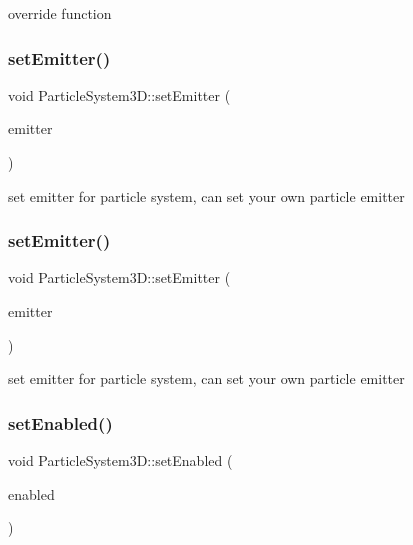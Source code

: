 override function \mbox{\label{classParticleSystem3D_aeb2593035516362a6e8209efdc8af68e}} 
\subsubsection{\texorpdfstring{set\+Emitter()}{setEmitter()}\hspace{0.1cm}{\footnotesize\ttfamily [1/2]}}
{\footnotesize\ttfamily void Particle\+System3\+D\+::set\+Emitter (\begin{DoxyParamCaption}\item[{\hyperlink{classParticle3DEmitter}{Particle3\+D\+Emitter} $\ast$}]{emitter }\end{DoxyParamCaption})}

set emitter for particle system, can set your own particle emitter \mbox{\label{classParticleSystem3D_aeb2593035516362a6e8209efdc8af68e}} 
\subsubsection{\texorpdfstring{set\+Emitter()}{setEmitter()}\hspace{0.1cm}{\footnotesize\ttfamily [2/2]}}
{\footnotesize\ttfamily void Particle\+System3\+D\+::set\+Emitter (\begin{DoxyParamCaption}\item[{\hyperlink{classParticle3DEmitter}{Particle3\+D\+Emitter} $\ast$}]{emitter }\end{DoxyParamCaption})}

set emitter for particle system, can set your own particle emitter \mbox{\label{classParticleSystem3D_a7e2e3536676b85183c6bb3e04e9f33ec}} 
\subsubsection{\texorpdfstring{set\+Enabled()}{setEnabled()}\hspace{0.1cm}{\footnotesize\ttfamily [1/2]}}
{\footnotesize\ttfamily void Particle\+System3\+D\+::set\+Enabled (\begin{DoxyParamCaption}\item[{bool}]{enabled }\end{DoxyParamCaption})}

